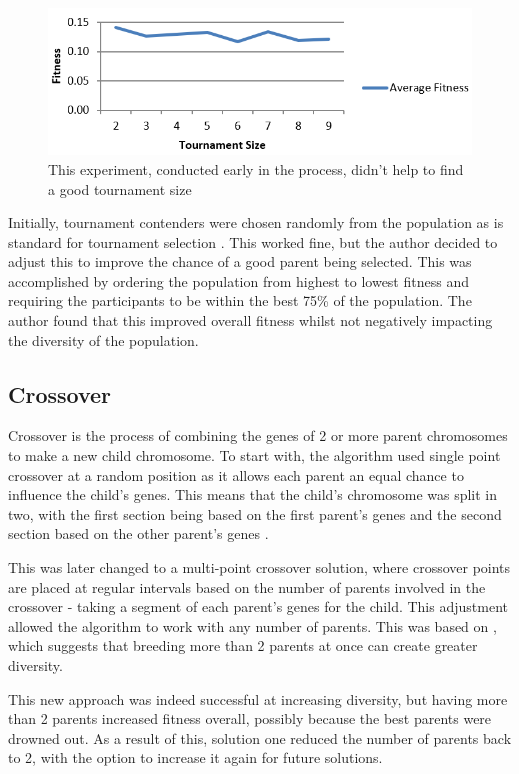 \documentclass[sigconf]{acmart}
\begin{document}
\begin{figure}[H]
\includegraphics[width=\columnwidth]{useless.png}
\caption[width=\columnwidth]{This experiment, conducted early in the process, didn't help to find a good tournament size} \label{Useless}
\end{figure}

Initially, tournament contenders were chosen randomly from the population as is standard for tournament selection \cite{tournament3}. This worked fine, but the author decided to adjust this to improve the chance of a good parent being selected. This was accomplished by ordering the population from highest to lowest fitness and requiring the participants to be within the best 75\% of the population. The author found that this improved overall fitness whilst not negatively impacting the diversity of the population.

\subsection{Crossover}
Crossover is the process of combining the genes of 2 or more parent chromosomes to make a new child chromosome. To start with, the algorithm used single point crossover at a random position as it allows each parent an equal chance to influence the child's genes. This means that the child's chromosome was split in two, with the first section being based on the first parent's genes and the second section based on the other parent's genes \cite{singlePoint}.

This was later changed to a multi-point crossover solution, where crossover points are placed at regular intervals based on the number of parents involved in the crossover - taking a segment of each parent's genes for the child. This adjustment allowed the algorithm to work with any number of parents. This was based on \cite{multipleParents}, which suggests that breeding more than 2 parents at once can create greater diversity.

This new approach was indeed successful at increasing diversity, but having more than 2 parents increased fitness overall, possibly because the best parents were drowned out. As a result of this, solution one reduced the number of parents back to 2, with the option to increase it again for future solutions.
\end{document}
